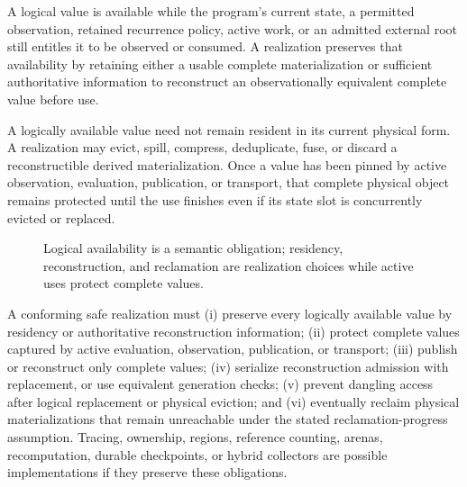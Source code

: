 \begin{definition}\label{def:availability}
A logical value is available while the program's current state, a permitted observation, retained recurrence policy, active work, or an admitted external root still entitles it to be observed or consumed. A realization preserves that availability by retaining either a usable complete materialization or sufficient authoritative information to reconstruct an observationally equivalent complete value before use.
\end{definition}
A logically available value need not remain resident in its current physical form. A realization may evict, spill, compress, deduplicate, fuse, or discard a reconstructible derived materialization. Once a value has been pinned by active observation, evaluation, publication, or transport, that complete physical object remains protected until the use finishes even if its state slot is concurrently evicted or replaced.

\iffullvisuals
\begin{figure}[t]
\centering
{}
\caption{Logical availability is a semantic obligation; residency, reconstruction, and reclamation are realization choices while active uses protect complete values.}\label{fig:logical-availability}
\end{figure}
\fi

A conforming safe realization must (i) preserve every logically available value by residency or authoritative reconstruction information; (ii) protect complete values captured by active evaluation, observation, publication, or transport; (iii) publish or reconstruct only complete values; (iv) serialize reconstruction admission with replacement, or use equivalent generation checks; (v) prevent dangling access after logical replacement or physical eviction; and (vi) eventually reclaim physical materializations that remain unreachable under the stated reclamation-progress assumption. Tracing, ownership, regions, reference counting, arenas, recomputation, durable checkpoints, or hybrid collectors are possible implementations if they preserve these obligations.

